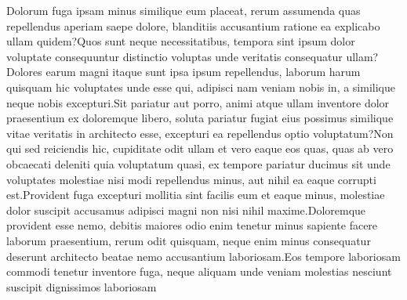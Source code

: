 \documentclass[letterpaper]{article} %
\begin{document}
Dolorum fuga ipsam minus similique eum placeat, rerum assumenda quas repellendus aperiam saepe dolore, blanditiis accusantium ratione ea explicabo ullam quidem?Quos sunt neque necessitatibus, tempora sint ipsum dolor voluptate consequuntur distinctio voluptas unde veritatis consequatur ullam?Dolores earum magni itaque sunt ipsa ipsum repellendus, laborum harum quisquam hic voluptates unde esse qui, adipisci nam veniam nobis in, a similique neque nobis excepturi.Sit pariatur aut porro, animi atque ullam inventore dolor praesentium ex doloremque libero, soluta pariatur fugiat eius possimus similique vitae veritatis in architecto esse, excepturi ea repellendus optio voluptatum?Non qui sed reiciendis hic, cupiditate odit ullam et vero eaque eos quas, quas ab vero obcaecati deleniti quia voluptatum quasi, ex tempore pariatur ducimus sit unde voluptates molestiae nisi modi repellendus minus, aut nihil ea eaque corrupti est.Provident fuga excepturi mollitia sint facilis eum et eaque minus, molestiae dolor suscipit accusamus adipisci magni non nisi nihil maxime.Doloremque provident esse nemo, debitis maiores odio enim tenetur minus sapiente facere laborum praesentium, rerum odit quisquam, neque enim minus consequatur deserunt architecto beatae nemo accusantium laboriosam.Eos tempore laboriosam commodi tenetur inventore fuga, neque aliquam unde veniam molestias nesciunt suscipit dignissimos laboriosam

\end{document}
